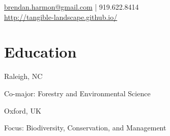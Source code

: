 \documentclass[]{baharmon-cv}
\begin{document}
%
%

%
%
{\vspace*{0.1cm} 
\href{mailto:brendan.harmon@gmail.com}{brendan.harmon@gmail.com} | 919.622.8414 \\
\url{http://tangible-landscape.github.io/} \\

}
%
%



%
%


\vspace*{0.2cm}
\section{Education} 
\begin{minipage}[t]{0.85\textwidth} 
\end{minipage}
\begin{minipage}[t]{0.15\textwidth} 
Raleigh, NC
\end{minipage}
Co-major: Forestry and Environmental Science
\vspace*{0.1cm}

\begin{minipage}[t]{0.85\textwidth} 
\end{minipage}
\begin{minipage}[t]{0.15\textwidth} 
Oxford, UK
\end{minipage}
Focus: Biodiversity, Conservation, and Management
\vspace*{0.1cm}
\end{document}
